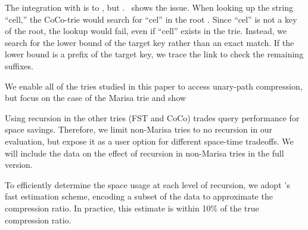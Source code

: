 The integration with  is 
to , but .~ shows the issue. When
looking up the string ``cell,'' the CoCo-trie would search for ``cel'' in the
root . Since ``cel'' is not a key of the
root, the lookup would fail, even if ``cell'' exists in the trie.
Instead, we search for the lower bound of the target key rather than an exact match. If the lower bound is a prefix of the target key, we trace the link to
check the remaining suffixes.

 We enable all of the  tries
studied in this paper to access unary-path compression, but focus on the case of
the Marisa trie and show 

Using recursion in the other tries (FST and CoCo) trades query performance for
space savings. Therefore, we limit non-Marisa tries to no recursion in our evaluation,
but expose it as a user option for different space-time tradeoffs. We will include the
data on the effect of recursion in non-Marisa tries in the full version.


 To efficiently determine the space
usage at each level of recursion, we adopt \fsst's fast estimation scheme,
encoding a subset of the data to approximate the compression ratio.  In
practice, this estimate is within 10\% of the true compression ratio.


